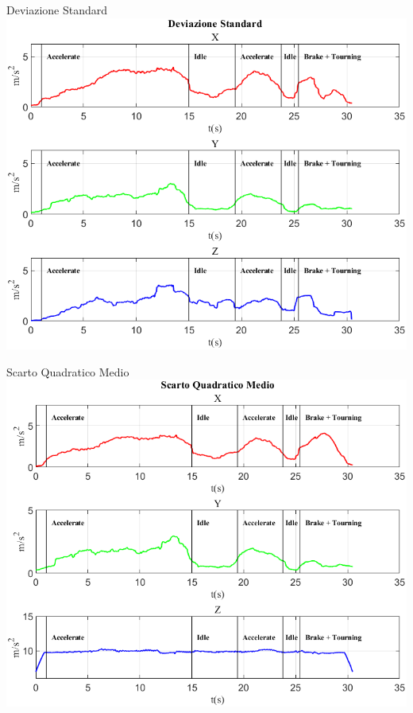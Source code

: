 \documentclass[beamer]{standalone}
\begin{document}
	\begin{frame}{{Deviazione Standard}}
			\centering\includegraphics[height=.8\textheight]{figure/Acc/Deviazione Standard}
		\end{frame}

	\begin{frame}{{Scarto Quadratico Medio}}
			\centering\includegraphics[height=.8\textheight]{figure/Acc/Scarto Quadratico Medio}
		\end{frame}
	
\end{document}
